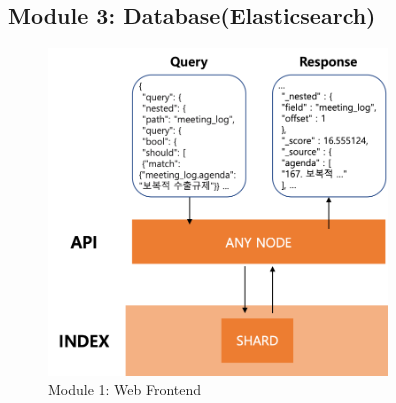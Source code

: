 \documentclass[conference]{IEEEtran}
\begin{document}
  
  \subsection{Module 3: Database(Elasticsearch)}
\begin{figure}[htbp]
	\centerline{\includegraphics[width=90mm,scale=0.5]{fig/6_8.png}}
	\caption{Module 1: Web Frontend}
	\label{fig}
	\end{figure}
	
\end{document}
